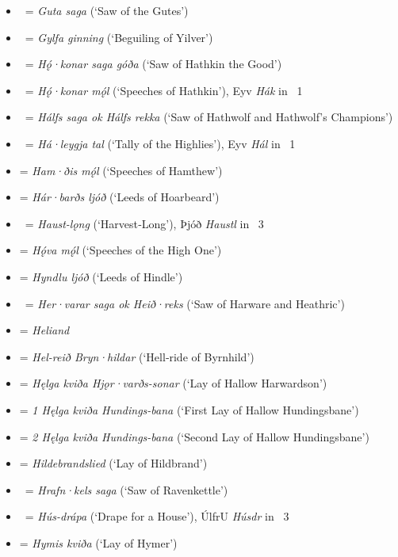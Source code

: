 \begin{itemize}
	\item \Gutasaga\ = \emph{Guta saga} (‘Saw of the Gutes’)
	\item \Gylfaginning\ = \emph{Gylfa ginning} (‘Beguiling of Yilver’)
	\item \HakonarSaga\ = \emph{Hǫ́·konar saga góða} (‘Saw of Hathkin the Good’)
	\item \Hakonarmal\ = \emph{Hǫ́·konar mǫ́l} (‘Speeches of Hathkin’), Eyv \emph{Hák} in \Skp\ 1
	\item \Halfssaga\ = \emph{Hálfs saga ok Hálfs rekka} (‘Saw of Hathwolf and Hathwolf’s Champions’)
	\item \Haleygjatal\ = \emph{Há·leygja tal} (‘Tally of the Highlies’), Eyv \emph{Hál} in \Skp\ 1
	\item \textbf{} = \emph{Ham·ðis mǫ́l} (‘Speeches of Hamthew’)
	\item \textbf{} = \emph{Hár·barðs ljóð} (‘Leeds of Hoarbeard’)
	\item \Haustlong\ = \emph{Haust-lǫng} (‘Harvest‑Long’), Þjóð \emph{Haustl} in \Skp\ 3
	\item \textbf{} = \emph{Hǫ́va mǫ́l} (‘Speeches of the High One’)
	\item \textbf{} = \emph{Hyndlu ljóð} (‘Leeds of Hindle’)
	\item \HervararSaga\ = \emph{Her·varar saga ok Heið·reks} (‘Saw of Harware and Heathric’)
	\item \textbf{} = \emph{Heliand}
	\item \textbf{} = \emph{Hel-reið Bryn·hildar} (‘Hell‑ride of Byrnhild’)
	\item \textbf{} = \emph{Hęlga kviða Hjǫr·varðs-sonar} (‘Lay of Hallow Harwardson’)
	\item \textbf{} = \emph{1 Hęlga kviða Hundings-bana} (‘First Lay of Hallow Hundingsbane’)
	\item \textbf{} = \emph{2 Hęlga kviða Hundings-bana} (‘Second Lay of Hallow Hundingsbane’)
	\item \textbf{} = \emph{Hildebrandslied} (‘Lay of Hildbrand’)
	\item \HrafnkelsSaga\ = \emph{Hrafn·kels saga} (‘Saw of Ravenkettle’)
	\item \Husdrapa\ = \emph{Hús-drápa} (‘Drape for a House’), ÚlfrU \emph{Húsdr} in \Skp\ 3
	\item \textbf{} = \emph{Hymis kviða} (‘Lay of Hymer’)

\end{itemize}
